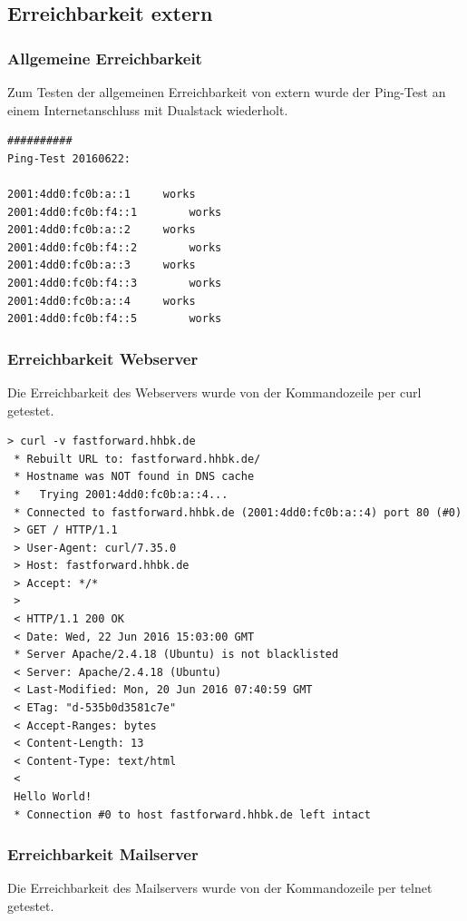 \subsection{Erreichbarkeit extern}

\subsubsection{Allgemeine Erreichbarkeit}

Zum Testen der allgemeinen Erreichbarkeit von extern wurde der Ping-Test an einem Internetanschluss mit Dualstack wiederholt.

\begin{lstlisting}
##########
Ping-Test 20160622:

2001:4dd0:fc0b:a::1		works
2001:4dd0:fc0b:f4::1		works
2001:4dd0:fc0b:a::2		works
2001:4dd0:fc0b:f4::2		works
2001:4dd0:fc0b:a::3		works
2001:4dd0:fc0b:f4::3		works
2001:4dd0:fc0b:a::4		works
2001:4dd0:fc0b:f4::5		works
\end{lstlisting}

\subsubsection{Erreichbarkeit Webserver}

Die Erreichbarkeit des Webservers wurde von der Kommandozeile per {\sc curl} getestet.

\begin{lstlisting}[numbers=none]
> curl -v fastforward.hhbk.de
 * Rebuilt URL to: fastforward.hhbk.de/
 * Hostname was NOT found in DNS cache
 *   Trying 2001:4dd0:fc0b:a::4...
 * Connected to fastforward.hhbk.de (2001:4dd0:fc0b:a::4) port 80 (#0)
 > GET / HTTP/1.1
 > User-Agent: curl/7.35.0
 > Host: fastforward.hhbk.de
 > Accept: */*
 > 
 < HTTP/1.1 200 OK
 < Date: Wed, 22 Jun 2016 15:03:00 GMT
 * Server Apache/2.4.18 (Ubuntu) is not blacklisted
 < Server: Apache/2.4.18 (Ubuntu)
 < Last-Modified: Mon, 20 Jun 2016 07:40:59 GMT
 < ETag: "d-535b0d3581c7e"
 < Accept-Ranges: bytes
 < Content-Length: 13
 < Content-Type: text/html
 < 
 Hello World!
 * Connection #0 to host fastforward.hhbk.de left intact
\end{lstlisting}

\subsubsection{Erreichbarkeit Mailserver}

Die Erreichbarkeit des Mailservers wurde von der Kommandozeile per {\sc telnet} getestet.

